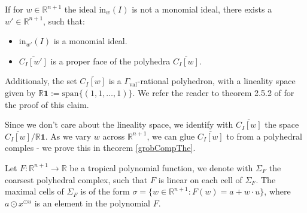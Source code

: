 \begin{remark}
    \label{facePolyRmk}
If for $w \in \mathbb{R}^{n+1}$ the ideal $\text{in}_{w}(I)$ is not a monomial ideal, there exists a $w'\in \mathbb{R}^{n+1}$, such that:
\begin{itemize}
    \item $\text{in}_{w'}(I)$ is a monomial ideal.
    \item $\overline{C_{I}[w']}$ is a proper face of the polyhedra $\overline{C_{I}[w]}$.
\end{itemize}
Additionaly, the set $\overline{C_{I}[w]}$ is a $\Gamma_{\text{val}}$-rational polyhedron, with a lineality space given by $\mathbb{R}\textbf{1}:= \text{span}\{(1,1,\dots,1)\}$. 
We refer the reader to theorem 2.5.2 of \cite{maclagan2015introduction} for the proof of this claim.
\par Since we don't care about the lineality space, we identify with $\overline{C_{I}[w]}$ the space $\overline{C_{I}[w]} / \mathbb{R}\textbf{1}$. 
As we vary $w$ across $\mathbb{R}^{n+1}$, we can glue $\overline{C_{I}[w]}$ to from a polyhedral comples - we prove this in theorem \ref{grobCompThe}.
\end{remark}

\begin{definition}
    Let $F: \mathbb{R}^{n+1}\to \mathbb{R}$ be a tropical polynomial function, we denote with $\Sigma_{F}$ the coarsest polyhedral complex, such that $F$ is linear on each cell of $\Sigma_{F}$.
    The maximal cells of $\Sigma_{F}$ is of the form $\sigma = \{w \in \mathbb{R}^{n+1}: F(w) = a + w \cdot u\}$, where $a\odot x^{\odot u}$ is an element in the polynomial $F$.
\end{definition}

